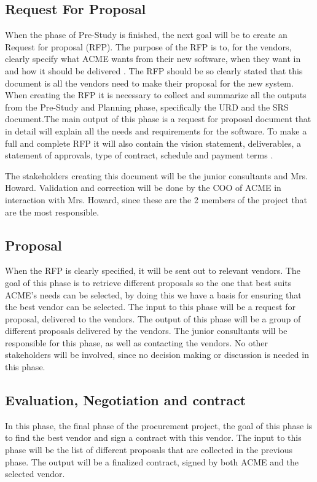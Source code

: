 \documentclass[a4paper]{article}
\begin{document}
\subsection{Request For Proposal}
\label{sub:request_for_propsal}
When the phase of Pre-Study is finished, the next goal will be to create an Request for proposal (RFP). The purpose of the RFP is to, for the vendors, clearly specify what ACME wants from their new software, when they want in and how it should be delivered \cite{SPM34}. The RFP should be so clearly stated that this document is all the vendors need to make their proposal for the new system. 
When creating the RFP it is necessary to collect and summarize all the outputs from the Pre-Study and Planning phase, specifically the URD and the SRS document.The main output of this phase is a request for proposal document that in detail will explain all the needs and requirements for the software. To make a full and complete RFP it will also contain the vision statement, deliverables, a statement of approvals, type of contract, schedule and payment terms \cite{SPM3536}.

The stakeholders creating this document will be the junior consultants and Mrs. Howard. Validation and correction will be done by the COO of ACME in interaction with Mrs. Howard, since these are the 2 members of the project that are the most responsible.

\subsection{Proposal}
\label{sub:proposal}
When the RFP is clearly specified, it will be sent out to relevant vendors.
The goal of this phase is to retrieve different proposals so the one that best suits ACME's needs can be selected, by doing this we have a basis for ensuring that the best vendor can be selected. The input to this phase will be a request for proposal, delivered to the vendors. The output of this phase will be a group of different proposals delivered by the vendors. The junior consultants will be responsible for this phase, as well as contacting the vendors. No other stakeholders will be involved, since no decision making or discussion is needed in this phase.

\subsection{Evaluation, Negotiation and contract}
\label{sub:evaluation_negotiation_and_contract}
In this phase, the final phase of the procurement project, the goal of this phase is to find the best vendor and sign a contract with this vendor. The input to this phase will be the list of different proposals that are collected in the previous phase. The output will be a finalized contract, signed by both ACME and the selected vendor. 
\end{document}
